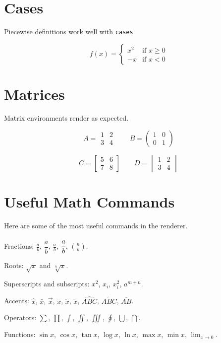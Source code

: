 \documentclass{article}
\begin{document}
\section{Cases}
Piecewise definitions work well with \texttt{cases}.

\[
f(x)=\begin{cases}
x^2 & \text{if } x \ge 0 \\
-x & \text{if } x < 0
\end{cases}
\]

\section{Matrices}
Matrix environments render as expected.

\[
A = \begin{matrix}
1 & 2 \\
3 & 4
\end{matrix}
\qquad
B = \begin{pmatrix}
1 & 0 \\
0 & 1
\end{pmatrix}
\]

\[
C = \begin{bmatrix}
5 & 6 \\
7 & 8
\end{bmatrix}
\qquad
D = \begin{vmatrix}
1 & 2 \\
3 & 4
\end{vmatrix}
\]

\section{Useful Math Commands}
Here are some of the most useful commands in the renderer.

Fractions: $\frac{a}{b}$, $\dfrac{a}{b}$, $\tfrac{a}{b}$, $\cfrac{a}{b}$, $\binom{n}{k}$.

Roots: $\sqrt{x}$ and $\sqrt[n]{x}$.

Superscripts and subscripts: $x^2$, $x_i$, $x_i^2$, $a^{m+n}$.

Accents: $\hat{x}$, $\bar{x}$, $\vec{x}$, $\dot{x}$, $\ddot{x}$, $\tilde{x}$, $\widehat{ABC}$, $\widetilde{ABC}$, $\overline{AB}$.

Operators: $\sum$, $\prod$, $\int$, $\iint$, $\iiint$, $\oint$, $\bigcup$, $\bigcap$.

Functions: $\sin x$, $\cos x$, $\tan x$, $\log x$, $\ln x$, $\max x$, $\min x$, $\lim_{x\to 0}$.
\end{document}
